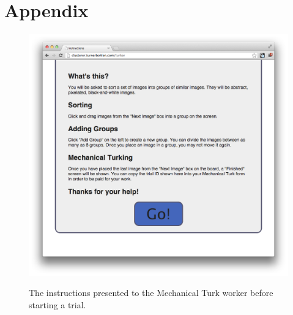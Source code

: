 \appendix
\section*{Appendix}
\begin{figure}[h!]
\centering
\includegraphics[width=5.6in]{img/instructions.png}
\label{fig:instructions}
\caption{The instructions presented to the Mechanical Turk worker before
  starting a trial.}
\end{figure}

